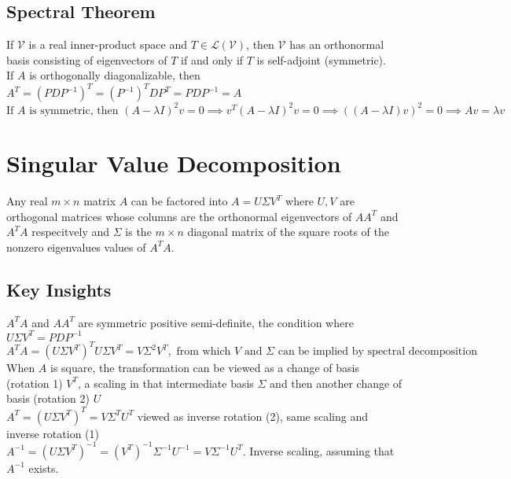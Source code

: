 \documentclass{article}
\newcommand{\linear}{\mathcal{L}}
\newcommand{\V}{\mathcal{V}}
\begin{document}
\subsection{Spectral Theorem}
If $\V$ is a real inner-product space and $T \in \linear(\V)$, then $\V$ has an orthonormal basis consisting of eigenvectors of $T$ if and only if $T$ is self-adjoint (symmetric). \\
If $A$ is orthogonally diagonalizable, then $A^T = (PDP^{-1})^T = (P^{-1})^TDP^T = PDP^{-1} = A$ \\
$\mbox{If } A \mbox { is symmetric, then } (A-\lambda I)^2v = 0 \implies v^T(A-\lambda I)^2v = 0 \implies ((A-\lambda I)v)^2 = 0 \implies Av = \lambda v$

\section{Singular Value Decomposition}
Any real $m \times n$ matrix $A$ can be factored into $A = U \Sigma V^T$ where $U, V$ are orthogonal matrices whose columns are the orthonormal eigenvectors of $AA^T$ and $A^TA$ respecitvely and $\Sigma$ is the $m \times n$ diagonal matrix of the square roots of the nonzero eigenvalues values of $A^TA$.
\subsection{Key Insights}
$A^TA$ and $AA^T$ are symmetric positive semi-definite, the condition where $U \Sigma V^T = PDP^{-1}$ \\
$A^TA = (U \Sigma V^T)^T U \Sigma V^T = V \Sigma^2 V^T, \mbox{ from which } V \mbox{ and } \Sigma \mbox{ can be implied by spectral decomposition}$ \\
When $A$ is square, the transformation can be viewed as a change of basis (rotation 1) $V^T$, a scaling in that intermediate basis $\Sigma$ and then another change of basis (rotation 2) $U$ \\
$A^T = (U \Sigma V^T)^T = V \Sigma^T U^T$ viewed as inverse rotation (2), same scaling and inverse rotation (1) \\
$A^{-1} = (U \Sigma V^T)^{-1} = (V^T)^{-1} \Sigma^{-1} U^{-1} = V \Sigma^{-1} U^T$. Inverse scaling, assuming that $A^{-1}$ exists.
\end{document}
